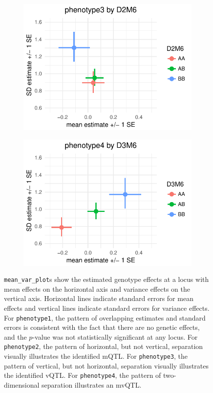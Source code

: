 \documentclass[9pt,twocolumn,twoside]{gsag3jnl}
\begin{document}
\begin{figure}[t]
    \begin{subfigure}[t]{0.5\linewidth}
        \includegraphics[width=\textwidth]{images/mean_var_plot_phen3.pdf}
    \end{subfigure}
    \hfill
    \begin{subfigure}[t]{0.5\linewidth}
        \includegraphics[width=\textwidth]{images/mean_var_plot_phen4.pdf}
    \end{subfigure}

    \caption{
        \texttt{mean\_var\_plot}s show the estimated genotype effects at a locus with mean effects on the horizontal axis and variance effects on the vertical axis.
        Horizontal lines indicate standard errors for mean effects and vertical lines indicate standard errors for variance effects.
        For \texttt{phenotype1}, the pattern of overlapping estimates and standard errors is consistent with the fact that there are no genetic effects, and the $p$-value was not statistically significant at any locus.
        For \texttt{phenotype2}, the pattern of horizontal, but not vertical, separation visually illustrates the identified mQTL.
        For \texttt{phenotype3}, the pattern of vertical, but not horizontal, separation visually illustrates the identified vQTL.
        For \texttt{phenotype4}, the pattern of two-dimensional separation illustrates an mvQTL.
        \label{fig:mean_var_plots}
    }
\end{figure}
\end{document}
